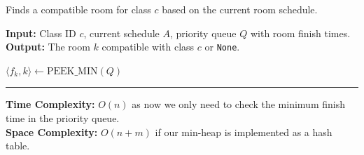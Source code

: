 \begin{Func}
    Finds a compatible room for class $c$ based on the current room schedule.

    \vspace{.5em}
    \noindent
    \textbf{Input:} Class ID $c$, current schedule $A$, priority queue $Q$ with room finish times.\\
    \textbf{Output:} The room $k$ compatible with class $c$ or \texttt{None}.\\
    \begin{algorithm}[H]
        \SetAlgoLined
        $\langle f_k, k \rangle \gets \text{PEEK\_MIN}(Q)$ 

    \end{algorithm}

    \vspace{1em}
    \noindent\rule{\textwidth}{0.4pt}

    \noindent
    \textbf{Time Complexity:} $O(n)$ as now we only need to check the minimum finish time in the priority queue.\\
    \textbf{Space Complexity:} $O(n+m)$ if our min-heap is implemented as a hash table.
\end{Func}

